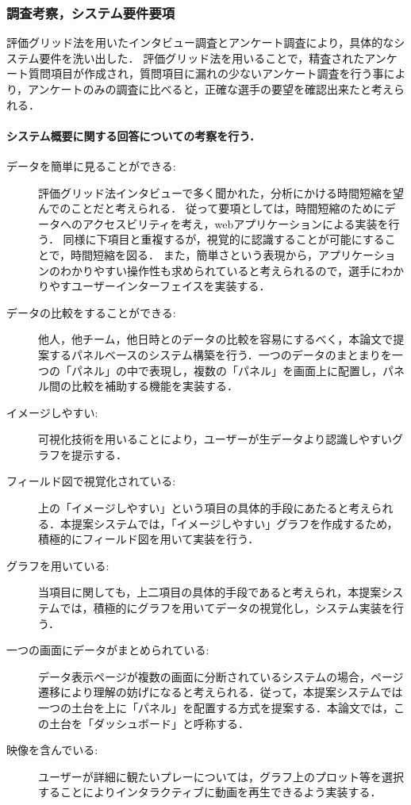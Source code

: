 \documentclass[sotsuron]{kuee}
\begin{document}
			\subsubsection{調査考察，システム要件要項}
				評価グリッド法を用いたインタビュー調査とアンケート調査により，具体的なシステム要件を洗い出した．
				評価グリッド法を用いることで，精査されたアンケート質問項目が作成され，質問項目に漏れの少ないアンケート調査を行う事により，アンケートのみの調査に比べると，正確な選手の要望を確認出来たと考えられる．
					\paragraph {システム概要に関する回答についての考察を行う．}
						\begin{description}
							\item [データを簡単に見ることができる:]
							評価グリッド法インタビューで多く聞かれた，分析にかける時間短縮を望んでのことだと考えられる．
							従って要項としては，時間短縮のためにデータへのアクセスビリティを考え，webアプリケーションによる実装を行う．
							同様に下項目と重複するが，視覚的に認識することが可能にすることで，時間短縮を図る．
							また，簡単さという表現から，アプリケーションのわかりやすい操作性も求められていると考えられるので，選手にわかりやすユーザーインターフェイスを実装する．
							\item [データの比較をすることができる:]
							他人，他チーム，他日時とのデータの比較を容易にするべく，本論文で提案するパネルベースのシステム構築を行う．一つのデータのまとまりを一つの「パネル」の中で表現し，複数の「パネル」を画面上に配置し，パネル間の比較を補助する機能を実装する．
							\item [イメージしやすい:]
							可視化技術を用いることにより，ユーザーが生データより認識しやすいグラフを提示する．
							\item [フィールド図で視覚化されている:]
							上の「イメージしやすい」という項目の具体的手段にあたると考えられる．本提案システムでは，「イメージしやすい」グラフを作成するため，積極的にフィールド図を用いて実装を行う．
							\item [グラフを用いている:]
							当項目に関しても，上二項目の具体的手段であると考えられ，本提案システムでは，積極的にグラフを用いてデータの視覚化し，システム実装を行う．
							\item [一つの画面にデータがまとめられている:]
							データ表示ページが複数の画面に分断されているシステムの場合，ページ遷移により理解の妨げになると考えられる．従って，本提案システムでは一つの土台を上に「パネル」を配置する方式を提案する．本論文では，この土台を「ダッシュボード」と呼称する．
							\item [映像を含んでいる:]
							ユーザーが詳細に観たいプレーについては，グラフ上のプロット等を選択することによりインタラクティブに動画を再生できるよう実装する．
						\end{description}
\end{document}
